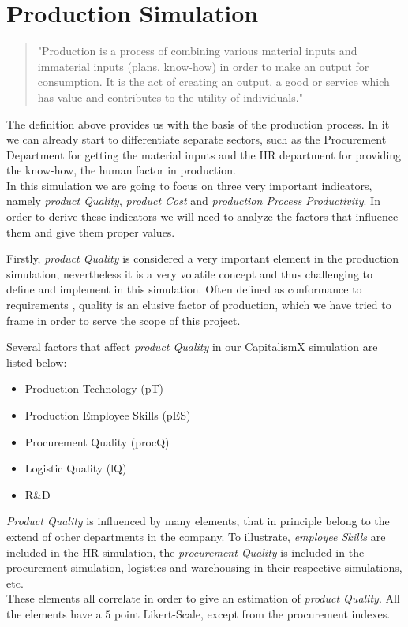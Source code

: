 \section{Production Simulation}
\label{sec:productionSim}
 \begin{quotation}
"Production is a process of combining various material inputs and immaterial inputs (plans, know-how) in order to make an output for consumption. It is the act of creating an output, a good or service which has value and contributes to the utility of individuals."\cite{noauthor_production_2019}
 \end{quotation}
The definition above provides us with the basis of the production process. In it we can already start to differentiate separate sectors, such as the Procurement Department for getting the material inputs and the HR department for providing the know-how, the human factor in production. \\
In this simulation we are going to focus on three very important indicators, namely \textit{product Quality}, \textit{product Cost} and \textit{production Process Productivity}. In order to derive these indicators we will need to analyze the factors that influence them and give them proper values. 

Firstly, \textit{product Quality} is considered a very important element in the production simulation, nevertheless it is a very volatile concept and thus challenging to define and implement in this simulation. Often defined as conformance to requirements \cite{crosby_quality_1979}, quality is an elusive factor of production, which we have tried to frame in order to serve the scope of this project.

 Several factors that affect \textit{product Quality} in our CapitalismX simulation are listed below:
\begin{itemize}
\item Production Technology (pT)
\item Production Employee Skills (pES)
\item Procurement Quality (procQ)
\item Logistic Quality (lQ)
\item R\&D
\end{itemize}
\textit{Product Quality} is influenced by many elements, that in principle belong to the extend of other departments in the company. To illustrate, \textit{employee Skills} are included in the HR simulation, the \textit{procurement Quality} is included in the procurement simulation, logistics and warehousing in their respective simulations, etc. \\
These elements all correlate in order to give an estimation of \textit{product Quality}.
All the elements have a $5$ point Likert-Scale, except from the procurement indexes. 

